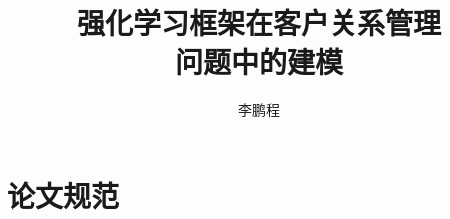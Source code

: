 \documentclass[master]{ustcthesis}
\title{强化学习框架在客户关系管理\\问题中的建模}
\author{李鹏程}
\begin{document}
\maketitle

%

\frontmatter

\tableofcontents
% 

\mainmatter






% 
% 
% 


\appendix
\chapter{论文规范}

\backmatter


\end{document}
